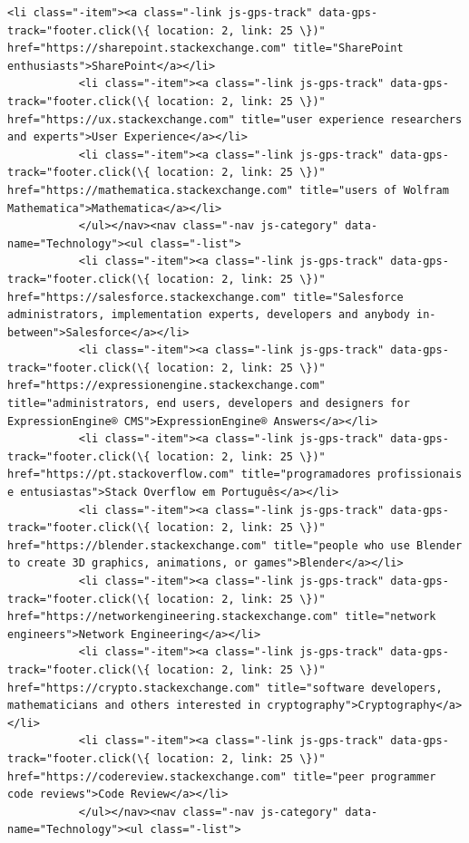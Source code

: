 \documentclass[11pt]{article}
\begin{document}
\begin{Verbatim}[commandchars=\\\{\}]
           <li class="-item"><a class="-link js-gps-track" data-gps-track="footer.click(\{ location: 2, link: 25 \})" href="https://sharepoint.stackexchange.com" title="SharePoint enthusiasts">SharePoint</a></li>
           <li class="-item"><a class="-link js-gps-track" data-gps-track="footer.click(\{ location: 2, link: 25 \})" href="https://ux.stackexchange.com" title="user experience researchers and experts">User Experience</a></li>
           <li class="-item"><a class="-link js-gps-track" data-gps-track="footer.click(\{ location: 2, link: 25 \})" href="https://mathematica.stackexchange.com" title="users of Wolfram Mathematica">Mathematica</a></li>
           </ul></nav><nav class="-nav js-category" data-name="Technology"><ul class="-list">
           <li class="-item"><a class="-link js-gps-track" data-gps-track="footer.click(\{ location: 2, link: 25 \})" href="https://salesforce.stackexchange.com" title="Salesforce administrators, implementation experts, developers and anybody in-between">Salesforce</a></li>
           <li class="-item"><a class="-link js-gps-track" data-gps-track="footer.click(\{ location: 2, link: 25 \})" href="https://expressionengine.stackexchange.com" title="administrators, end users, developers and designers for ExpressionEngine® CMS">ExpressionEngine® Answers</a></li>
           <li class="-item"><a class="-link js-gps-track" data-gps-track="footer.click(\{ location: 2, link: 25 \})" href="https://pt.stackoverflow.com" title="programadores profissionais e entusiastas">Stack Overflow em Português</a></li>
           <li class="-item"><a class="-link js-gps-track" data-gps-track="footer.click(\{ location: 2, link: 25 \})" href="https://blender.stackexchange.com" title="people who use Blender to create 3D graphics, animations, or games">Blender</a></li>
           <li class="-item"><a class="-link js-gps-track" data-gps-track="footer.click(\{ location: 2, link: 25 \})" href="https://networkengineering.stackexchange.com" title="network engineers">Network Engineering</a></li>
           <li class="-item"><a class="-link js-gps-track" data-gps-track="footer.click(\{ location: 2, link: 25 \})" href="https://crypto.stackexchange.com" title="software developers, mathematicians and others interested in cryptography">Cryptography</a></li>
           <li class="-item"><a class="-link js-gps-track" data-gps-track="footer.click(\{ location: 2, link: 25 \})" href="https://codereview.stackexchange.com" title="peer programmer code reviews">Code Review</a></li>
           </ul></nav><nav class="-nav js-category" data-name="Technology"><ul class="-list">

\end{Verbatim}
\end{document}
